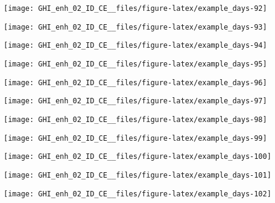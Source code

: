 \documentclass[
  10pt,
  a4paper,oneside]{article}
\begin{document}
\begin{center}\texttt{[image: GHI\_enh\_02\_ID\_CE\_\_files/figure-latex/example\_days-92]} \end{center}

\begin{center}\texttt{[image: GHI\_enh\_02\_ID\_CE\_\_files/figure-latex/example\_days-93]} \end{center}

\begin{center}\texttt{[image: GHI\_enh\_02\_ID\_CE\_\_files/figure-latex/example\_days-94]} \end{center}

\begin{center}\texttt{[image: GHI\_enh\_02\_ID\_CE\_\_files/figure-latex/example\_days-95]} \end{center}

\begin{center}\texttt{[image: GHI\_enh\_02\_ID\_CE\_\_files/figure-latex/example\_days-96]} \end{center}

\begin{center}\texttt{[image: GHI\_enh\_02\_ID\_CE\_\_files/figure-latex/example\_days-97]} \end{center}

\begin{center}\texttt{[image: GHI\_enh\_02\_ID\_CE\_\_files/figure-latex/example\_days-98]} \end{center}

\begin{center}\texttt{[image: GHI\_enh\_02\_ID\_CE\_\_files/figure-latex/example\_days-99]} \end{center}

\begin{center}\texttt{[image: GHI\_enh\_02\_ID\_CE\_\_files/figure-latex/example\_days-100]} \end{center}

\begin{center}\texttt{[image: GHI\_enh\_02\_ID\_CE\_\_files/figure-latex/example\_days-101]} \end{center}

\begin{center}\texttt{[image: GHI\_enh\_02\_ID\_CE\_\_files/figure-latex/example\_days-102]} \end{center}
\end{document}
